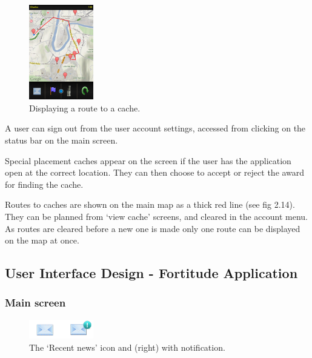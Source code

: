 \begin{figure}
	\vspace{-60pt}
	\begin{center}
	\includegraphics[width=0.25\textwidth]{images/route_mapping}
	\caption{Displaying a route to a cache.}
	\label{route_mapping}
	\end{center}
	\vspace{-30pt}
\end{figure}

A user can sign out from the user account settings, accessed from clicking on the status bar on the main screen.

Special placement caches appear on the screen if the user has the application open at the correct location. They can then choose to accept or reject the award for finding the cache.

Routes to caches are shown on the main map as a thick red line (see fig 2.14). They can be planned from `view cache' screens, and cleared in the account menu. As routes are cleared before a new one is made only one route can be displayed on the map at once.
\vspace{30pt}

\subsection{User Interface Design - Fortitude Application}

\subsubsection{Main screen}

\begin{figure}
	\vspace{-20pt}
	\begin{center}
	\includegraphics[width=0.25\textwidth]{images/news_icons}
	\caption{The `Recent news' icon and (right) with notification.}
	\label{news_icons}
	\end{center}
	\vspace{-20pt}
\end{figure}

